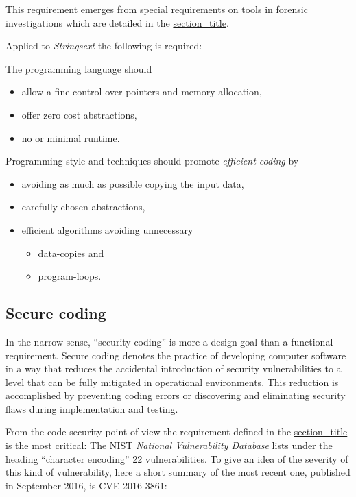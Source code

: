 This requirement emerges from special requirements on tools in forensic
investigations which are detailed in the
\protect\hyperlink{_code_efficiency}{section\_title}.

Applied to \emph{Strings­ext} the following is required:

The programming language should

\begin{itemize}
\item
  allow a fine control over pointers and memory allocation,
\item
  offer zero cost abstractions,
\item
  no or minimal runtime.
\end{itemize}

Programming style and techniques should promote \emph{efficient coding}
by

\begin{itemize}
\item
  avoiding as much as possible copying the input data,
\item
  carefully chosen abstractions,
\item
  efficient algorithms avoiding unnecessary

  \begin{itemize}
  \item
    data-copies and
  \item
    program-loops.
  \end{itemize}
\end{itemize}

\hypertarget{security2}{\subsection{Secure coding}\label{security2}}

In the narrow sense, ``security coding'' is more a design goal than a
functional requirement. Secure coding denotes the practice of developing
computer software in a way that reduces the accidental introduction of
security vulnerabilities to a level that can be fully mitigated in
operational environments. This reduction is accomplished by preventing
coding errors or discovering and eliminating security flaws during
implementation and testing.

From the code security point of view the requirement defined in the
\protect\hyperlink{character-encoding-support}{section\_title} is the
most critical: The NIST \emph{National Vulnerability Database} lists
under the heading ``character encoding'' 22 vulnerabilities. To give an
idea of the severity of this kind of vul­ne­ra­bi­li­ty, here a short
summary of the most recent one, published in September 2016, is
CVE-2016-3861:

